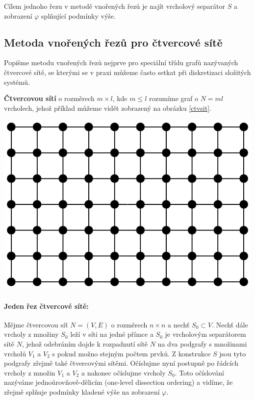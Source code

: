 \documentclass[11pt,american,czech,oneside]{book}
\theoremstyle{plain}
\theoremstyle{definition}
\begin{document}
Cílem jednoho řezu v metodě vnořených řezů je najít vrcholový separátor $S$ a zobrazení $\varphi$ splňující podmínky výše.

\subsection{Metoda vnořených řezů pro čtvercové sítě}

Popišme metodu vnořených řezů nejprve pro speciální třídu grafů nazývaných čtvercové sítě, se kterými se v praxi můžeme často setkat při diskretizaci složitých systémů.

\textbf{Čtvercovou sítí} o rozměrech $m \times l$, kde $m \leq l$ rozumíme graf o $N = ml$  vrcholech, jehož příklad můžeme vidět zobrazený na obrázku \ref{ctvsit}.

\medskip
{
  \centering
  \includegraphics[scale=0.6]{pictures/ctvercovasit.pdf}
}

\paragraph{Jeden řez čtvercové sítě:}

Mějme čtvercovou síť $N = (V,E)$ o rozměrech $n \times n$ a nechť $S_0 \subset V$. Nechť dále vrcholy z množiny $S_0$ leží v síti na jedné přímce a $S_0$ je vrcholovým separátorem sítě $N$, jehož odebráním dojde k rozpadnutí sítě $N$ na dva podgrafy s množinami vrcholů $V_1$ a $V_2$ s pokud možno stejným počtem prvků. Z konstrukce $S$ jsou tyto podgrafy zřejmě také čtvercovými sítěmi. Očíslujme nyní postupně po řádcích vrcholy z množin $V_1$ a $V_2$ a nakonec očíslujme vrcholy $S_0$. Toto očíslování nazýváme jednoúrovňově-dělicím (one-level dissection ordering) a vidíme, že zřejmě splňuje podmínky kladené výše na zobrazení $\varphi$.
\end{document}

